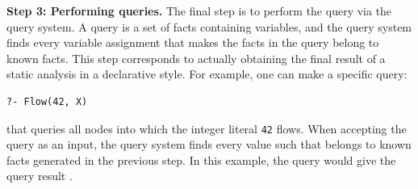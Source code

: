 \smallskip
\textbf{Step 3: Performing queries.}
The final step is to perform the query via the query system.  A query is a set
of facts containing variables, and the query system finds every variable
assignment that makes the facts in the query belong to known facts.  This step
corresponds to actually obtaining the final result of a static analysis in a
declarative style.  For example, one can make a specific query:

\begin{lstlisting}[style=mrule]
?- Flow(42, X)
\end{lstlisting}

\noindent
that queries all nodes into which the integer literal {\tt 42} flows.  When
accepting the query as an input, the query system finds every value 
such that  belongs to known facts generated in the previous
step.  In this example, the query would give the query result .
